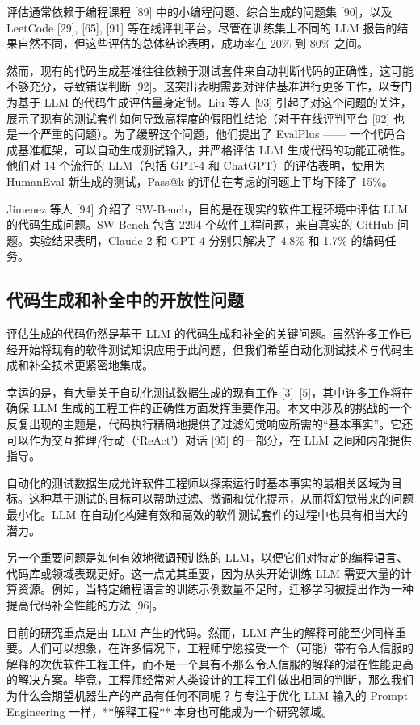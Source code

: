 \begin{translation}
评估通常依赖于编程课程 [89] 中的小编程问题、综合生成的问题集 [90]，以及 LeetCode [29], [65], [91] 等在线评判平台。尽管在训练集上不同的 LLM 报告的结果自然不同，但这些评估的总体结论表明，成功率在 20\% 到 80\% 之间。

然而，现有的代码生成基准往往依赖于测试套件来自动判断代码的正确性，这可能不够充分，导致错误判断 [92]。这突出表明需要对评估基准进行更多工作，以专门为基于 LLM 的代码生成评估量身定制。Liu 等人 [93] 引起了对这个问题的关注，展示了现有的测试套件如何导致高程度的假阳性结论（对于在线评判平台 [92] 也是一个严重的问题）。为了缓解这个问题，他们提出了 EvalPlus —— 一个代码合成基准框架，可以自动生成测试输入，并严格评估 LLM 生成代码的功能正确性。他们对 14 个流行的 LLM（包括 GPT-4 和 ChatGPT）的评估表明，使用为 HumanEval 新生成的测试，Pass@k 的评估在考虑的问题上平均下降了 15\%。

Jimenez 等人 [94] 介绍了 SW-Bench，目的是在现实的软件工程环境中评估 LLM 的代码生成问题。SW-Bench 包含 2294 个软件工程问题，来自真实的 GitHub 问题。实验结果表明，Claude 2 和 GPT-4 分别只解决了 4.8\% 和 1.7\% 的编码任务。

\subsection{代码生成和补全中的开放性问题}

评估生成的代码仍然是基于 LLM 的代码生成和补全的关键问题。虽然许多工作已经开始将现有的软件测试知识应用于此问题，但我们希望自动化测试技术与代码生成和补全技术更紧密地集成。

幸运的是，有大量关于自动化测试数据生成的现有工作 [3]–[5]，其中许多工作将在确保 LLM 生成的工程工件的正确性方面发挥重要作用。本文中涉及的挑战的一个反复出现的主题是，代码执行精确地提供了过滤幻觉响应所需的“基本事实”。它还可以作为交互推理/行动（‘ReAct’）对话 [95] 的一部分，在 LLM 之间和内部提供指导。

自动化的测试数据生成允许软件工程师以探索运行时基本事实的最相关区域为目标。这种基于测试的目标可以帮助过滤、微调和优化提示，从而将幻觉带来的问题最小化。LLM 在自动化构建有效和高效的软件测试套件的过程中也具有相当大的潜力。

另一个重要问题是如何有效地微调预训练的 LLM，以便它们对特定的编程语言、代码库或领域表现更好。这一点尤其重要，因为从头开始训练 LLM 需要大量的计算资源。例如，当特定编程语言的训练示例数量不足时，迁移学习被提出作为一种提高代码补全性能的方法 [96]。

目前的研究重点是由 LLM 产生的代码。然而，LLM 产生的解释可能至少同样重要。人们可以想象，在许多情况下，工程师宁愿接受一个（可能）带有令人信服的解释的次优软件工程工件，而不是一个具有不那么令人信服的解释的潜在性能更高的解决方案。毕竟，工程师经常对人类设计的工程工件做出相同的判断，那么我们为什么会期望机器生产的产品有任何不同呢？与专注于优化 LLM 输入的 Prompt Engineering 一样，**解释工程** 本身也可能成为一个研究领域。


\end{translation}
